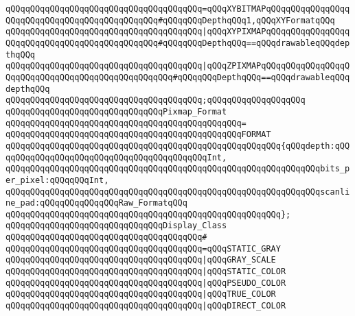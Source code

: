 \verb|qQQqqQQqqQQqqQQqqQQqqQQqqQQqqQQqqQQqqQQq=qQQqXYBITMAPqQQqqQQqqQQqqQQqqQQqqQQqqQQqqQQqqQQqqQQqqQQqqQQq#qQQqqQQqDepthqQQq1,qQQqXYFormatqQQq|\newline
\verb|qQQqqQQqqQQqqQQqqQQqqQQqqQQqqQQqqQQqqQQq|\verb#|qQQqXYPIXMAPqQQqqQQqqQQqqQQqqQQqqQQqqQQqqQQqqQQqqQQqqQQqqQQq#\verb|#qQQqqQQqDepthqQQq==qQQqdrawableqQQqdepthqQQq|\newline
\verb|qQQqqQQqqQQqqQQqqQQqqQQqqQQqqQQqqQQqqQQq|\verb#|qQQqZPIXMAPqQQqqQQqqQQqqQQqqQQqqQQqqQQqqQQqqQQqqQQqqQQqqQQqqQQq#\verb|#qQQqqQQqDepthqQQq==qQQqdrawableqQQqdepthqQQq|\newline
\verb|qQQqqQQqqQQqqQQqqQQqqQQqqQQqqQQqqQQqqQQq;qQQqqQQqqQQqqQQqqQQq|\newline
\newline
\verb|qQQqqQQqqQQqqQQqqQQqqQQqqQQqqQQqPixmap_Format|\newline
\verb|qQQqqQQqqQQqqQQqqQQqqQQqqQQqqQQqqQQqqQQqqQQqqQQq=|\newline
\verb|qQQqqQQqqQQqqQQqqQQqqQQqqQQqqQQqqQQqqQQqqQQqqQQqFORMAT|\newline
\verb|qQQqqQQqqQQqqQQqqQQqqQQqqQQqqQQqqQQqqQQqqQQqqQQqqQQqqQQq{qQQqdepth:qQQqqQQqqQQqqQQqqQQqqQQqqQQqqQQqqQQqqQQqqQQqInt,|\newline
\verb|qQQqqQQqqQQqqQQqqQQqqQQqqQQqqQQqqQQqqQQqqQQqqQQqqQQqqQQqqQQqqQQqbits_per_pixel:qQQqqQQqInt,|\newline
\verb|qQQqqQQqqQQqqQQqqQQqqQQqqQQqqQQqqQQqqQQqqQQqqQQqqQQqqQQqqQQqqQQqscanline_pad:qQQqqQQqqQQqqQQqRaw_FormatqQQq|\newline
\verb|qQQqqQQqqQQqqQQqqQQqqQQqqQQqqQQqqQQqqQQqqQQqqQQqqQQqqQQq};|\newline
\newline
\verb|qQQqqQQqqQQqqQQqqQQqqQQqqQQqqQQqDisplay_Class|\newline
\verb|qQQqqQQqqQQqqQQqqQQqqQQqqQQqqQQqqQQqqQQq#|\newline
\verb|qQQqqQQqqQQqqQQqqQQqqQQqqQQqqQQqqQQqqQQq=qQQqSTATIC_GRAY|\newline
\verb|qQQqqQQqqQQqqQQqqQQqqQQqqQQqqQQqqQQqqQQq|\verb#|qQQqGRAY_SCALE#\newline
\verb|qQQqqQQqqQQqqQQqqQQqqQQqqQQqqQQqqQQqqQQq|\verb#|qQQqSTATIC_COLOR#\newline
\verb|qQQqqQQqqQQqqQQqqQQqqQQqqQQqqQQqqQQqqQQq|\verb#|qQQqPSEUDO_COLOR#\newline
\verb|qQQqqQQqqQQqqQQqqQQqqQQqqQQqqQQqqQQqqQQq|\verb#|qQQqTRUE_COLOR#\newline
\verb|qQQqqQQqqQQqqQQqqQQqqQQqqQQqqQQqqQQqqQQq|\verb#|qQQqDIRECT_COLOR#\newline
